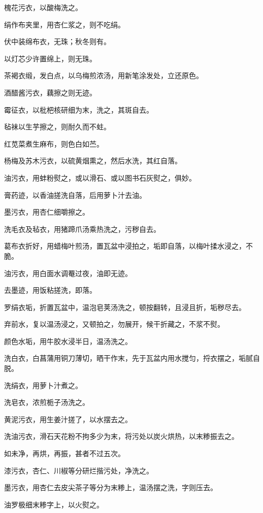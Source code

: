 \documentclass[a4paper,12pt,UTF8,twoside]{ctexbook}
\begin{document}
    槐花污衣，以酸梅洗之。
    
    绢作布夹里，用杏仁浆之，则不吃绢。
    
    伏中装绵布衣，无珠；秋冬则有。
    
    以灯芯少许置绵上，则无珠。
    
    茶褐衣缎，发白点，以乌梅煎浓汤，用新笔涂发处，立还原色。
    
    酒醋酱污衣，藕擦之则无迹。
    
    霉征衣，以枇杷核研细为末，洗之，其斑自去。
    
    毡袜以生芋擦之，则耐久而不蛀。
    
    红苋菜煮生麻布，则色白如苎。
    
    杨梅及苏木污衣，以硫黄烟熏之，然后水洗，其红自落。
    
    油污衣，用蚌粉熨之，或以滑石、或以图书石灰熨之，俱妙。
    
    膏药迹，以香油搓洗自落，后用萝卜汁去油。
    
    墨污衣，用杏仁细嚼擦之。
    
    洗毛衣及毡衣，用猪蹄爪汤乘热洗之，污秽自去。
    
    葛布衣折好，用蜡梅叶煎汤，置瓦盆中浸拍之，垢即自落，以梅叶揉水浸之，不脆。
    
    油污衣，用白面水调罨过夜，油即无迹。
    
    去墨迹，用饭粘搓洗，即落。
    
    罗绢衣垢，折置瓦盆中，温泡皂荚汤洗之，顿按翻转，且浸且折，垢秽尽去。
    
    弃前水，复以温汤浸之，又顿拍之，勿展开，候干折藏之，不浆不熨。
    
    颜色水垢，用牛胶水浸半日，温汤洗之。
    
    洗白衣，白菖蒲用铜刀薄切，晒干作末，先于瓦盆内用水搅匀，捋衣摆之，垢腻自脱。
    
    洗绢衣，用萝卜汁煮之。
    
    洗皂衣，浓煎栀子汤洗之。
    
    黄泥污衣，用生姜汁搓了，以水摆去之。
    
    洗油污衣，滑石天花粉不拘多少为末，将污处以炭火烘热，以末糁振去之。
    
    如未净，再烘，再振，甚者不过五次。
    
    漆污衣，杏仁、川椒等分研烂揩污处，净洗之。
    
    墨污衣，用杏仁去皮尖茶子等分为末糁上，温汤摆之洗，字则压去。
    
    油罗极细末糁字上，以火熨之。
    
\end{document}
